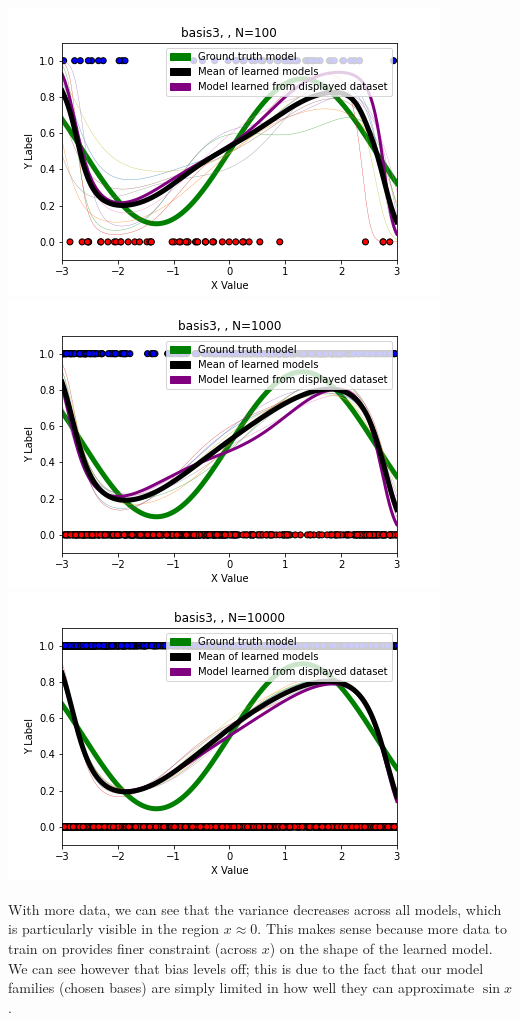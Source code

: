 \documentclass[submit]{harvardml}
\begin{document}
\begin{enumerate}
            \includegraphics[scale=0.3]{solutions/T2_P1_plots/basis3, N=100.png}
            \includegraphics[scale=0.3]{solutions/T2_P1_plots/basis3, N=1000.png}
            \includegraphics[scale=0.3]{solutions/T2_P1_plots/basis3, N=10000.png}

            With more data, we can see that the variance decreases across all models,
            which is particularly visible in the region $x \approx 0$.
            This makes sense because more data to train on provides finer constraint (across $x$)
            on the shape of the learned model. We can see however that bias
            levels off; this is due to the fact that our model families (chosen bases)
            are simply limited in how well they can approximate $\sin x$.

        \end{enumerate}
\end{document}
